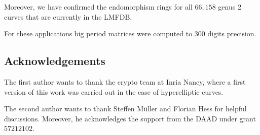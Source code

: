 \documentclass[main.tex]{subfiles}
\begin{document}
  Moreover, we have confirmed the endomorphism rings for all $66,158$ genus 2 curves that are currently in the LMFDB.
 
  For these applications big period matrices were computed to $300$ digits precision.
  
  \subsection{Acknowledgements}

  The first author wants to thank the crypto team at Inria Nancy, where
  a first version of this work was carried out in the case of hyperelliptic
  curves.
  
  The second author wants to thank Steffen Müller and Florian Hess for helpful discussions. Moreover, he acknowledges the support from the DAAD under grant $57212102$. 
\end{document}
